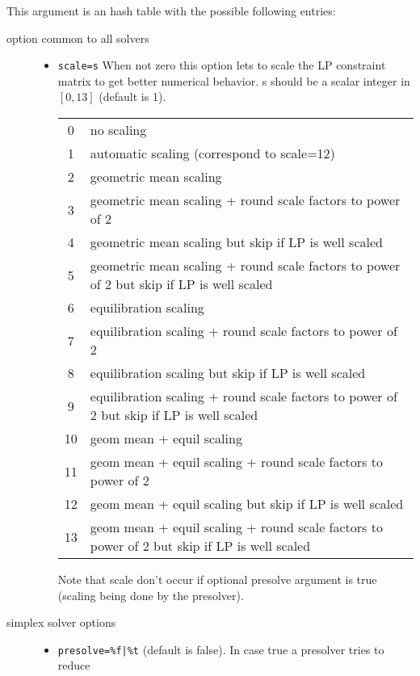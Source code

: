 \begin{mandescription}
This argument is an hash table with the possible following entries:
\begin{description}
\item[option common to all solvers]
\begin{itemize}
\item \verb+scale=s+ When not zero this option lets to scale the LP constraint matrix to get better 
      numerical behavior.  s should be a scalar integer in $[0,13]$ (default is 1).
      \begin{tabular}{|c|l|}
        \hline
        0 & no scaling \\
        1 & automatic scaling (correspond to scale=12) \\
        2 & geometric mean scaling\\
        3 & geometric mean scaling + round scale factors to power of 2\\
        4 & geometric mean scaling but skip if LP is well scaled\\
        5 & geometric mean scaling + round scale factors to power of 2 but skip if LP is well scaled\\
        6 & equilibration scaling\\
        7 & equilibration scaling + round scale factors to power of 2\\
        8 & equilibration scaling but skip if LP is well scaled\\
        9 & equilibration scaling + round scale factors to power of 2 but skip if LP is well scaled\\
       10 & geom mean + equil scaling\\
       11 & geom mean + equil scaling  + round scale factors to power of 2\\
       12 & geom mean + equil scaling but skip if LP is well scaled\\
       13 &  geom mean + equil scaling + round scale factors to power of 2 but skip if LP is well scaled\\
       \hline
      \end{tabular}
      Note that scale don't occur if optional presolve argument is true (scaling being done by the presolver). 
\end{itemize}
\item[simplex solver options]
\begin{itemize}
\item \verb+presolve=%f|%t+ (default is false). In case true a presolver tries to reduce

\end{itemize}
\end{description}
\end{mandescription}

